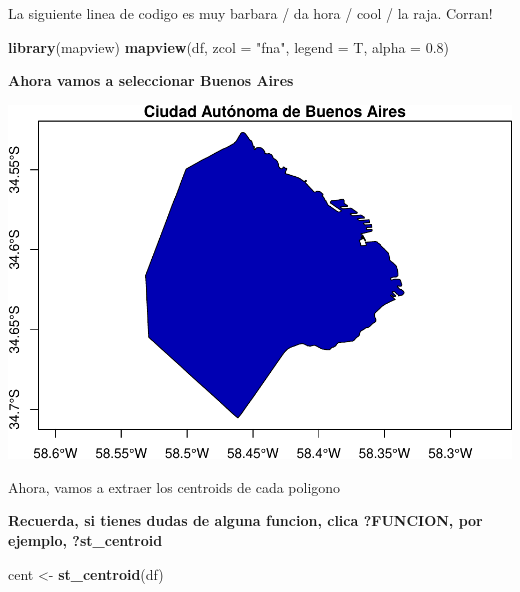 \documentclass[]{book}
\newenvironment{Shaded}{\begin{snugshade}}{\end{snugshade}}
\newcommand{\DataTypeTok}[1]{\textcolor[rgb]{0.13,0.29,0.53}{#1}}
\newcommand{\DecValTok}[1]{\textcolor[rgb]{0.00,0.00,0.81}{#1}}
\newcommand{\FloatTok}[1]{\textcolor[rgb]{0.00,0.00,0.81}{#1}}
\newcommand{\KeywordTok}[1]{\textcolor[rgb]{0.13,0.29,0.53}{\textbf{#1}}}
\newcommand{\NormalTok}[1]{#1}
\newcommand{\OperatorTok}[1]{\textcolor[rgb]{0.81,0.36,0.00}{\textbf{#1}}}
\newcommand{\StringTok}[1]{\textcolor[rgb]{0.31,0.60,0.02}{#1}}
\begin{document}
La siguiente linea de codigo es muy barbara / da hora / cool / la raja. Corran!

\begin{Shaded}
\begin{Highlighting}[]
\KeywordTok{library}\NormalTok{(mapview)}
\KeywordTok{mapview}\NormalTok{(df, }\DataTypeTok{zcol =} \StringTok{"fna"}\NormalTok{, }\DataTypeTok{legend =}\NormalTok{ T, }\DataTypeTok{alpha =} \FloatTok{0.8}\NormalTok{)}
\end{Highlighting}
\end{Shaded}

\textbf{Ahora vamos a seleccionar Buenos Aires}

\begin{Shaded}
\end{Shaded}

\includegraphics{bookdown-demo_files/figure-latex/unnamed-chunk-48-1.pdf}

Ahora, vamos a extraer los centroids de cada poligono

\textbf{Recuerda, si tienes dudas de alguna funcion, clica ?FUNCION, por ejemplo, ?st\_centroid}

\begin{Shaded}
\begin{Highlighting}[]
\NormalTok{cent <-}\StringTok{ }\KeywordTok{st_centroid}\NormalTok{(df)}
\end{Highlighting}
\end{Shaded}
\end{document}
